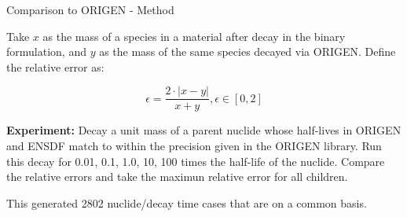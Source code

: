 \documentclass[xcolor=x11names,compress]{beamer}
\begin{document}
\begin{frame}{Comparison to ORIGEN - Method}

    Take $x$ as the mass of a species in a material 
    after decay in the binary formulation, and $y$ as the mass of the 
    same species decayed via ORIGEN. Define the relative error as:

    \vspace*{1em}
    \begin{equation}
    \epsilon = \frac{2 \cdot |x - y|}{x + y}, \epsilon \in [0, 2]
    \end{equation}

    \vspace*{1em}
    \textbf{Experiment:} Decay a unit mass of a parent
    nuclide whose half-lives 
    in ORIGEN and ENSDF match to within the precision given in the ORIGEN 
    library. Run this decay  for 0.01, 0.1, 1.0, 10, 100 times the half-life 
    of the nuclide. Compare the relative errors and take the maximun relative
    error for all children.

    \vspace*{1em}
    This generated 2802 nuclide/decay time cases that are on a common basis.

\end{frame}

\end{document}
